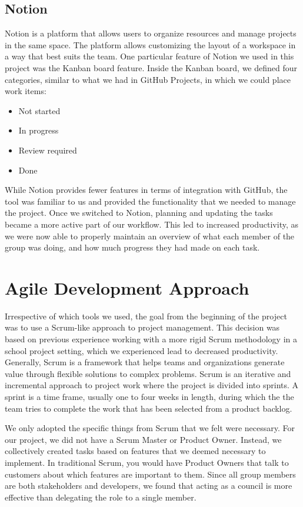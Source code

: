 \subsection{Notion}
Notion is a platform that allows users to organize resources and manage projects in the same space. The platform allows customizing the layout of a workspace in a way that best suits the team. One particular feature of Notion we used in this project was the Kanban board feature. Inside the Kanban board, we defined four categories, similar to what we had in GitHub Projects, in which we could place work items:

\begin{itemize}
    \item Not started
    \item In progress
    \item Review required
    \item Done
\end{itemize}

While Notion provides fewer features in terms of integration with GitHub, the tool was familiar to us and provided the functionality that we needed to manage the project.
Once we switched to Notion, planning and updating the tasks became a more active part of our workflow. This led to increased productivity, as we were now able to properly maintain an overview of what each member of the group was doing, and how much progress they had made on each task.

\section{Agile Development Approach} \label{sec:agile-dev}
Irrespective of which tools we used, the goal from the beginning of the project was to use a Scrum-like approach to project management.
This decision was based on previous experience working with a more rigid Scrum methodology in a school project setting, which we experienced lead to decreased productivity.
Generally, Scrum is a framework that helps teams and organizations generate value through flexible solutions to complex problems. Scrum is an iterative and incremental approach to project work where the project is divided into sprints. A sprint is a time frame, usually one to four weeks in length, during which the the team tries to complete the work that has been selected from a product backlog\cite{sutherlandScrumArtDoing2014}.

We only adopted the specific things from Scrum that we felt were necessary. For our project, we did not have a Scrum Master or Product Owner. Instead, we collectively created tasks based on features that we deemed necessary to implement.
In traditional Scrum, you would have Product Owners that talk to customers about which features are important to them. Since all group members are both stakeholders and developers, we found that acting as a council is more effective than delegating the role to a single member.

